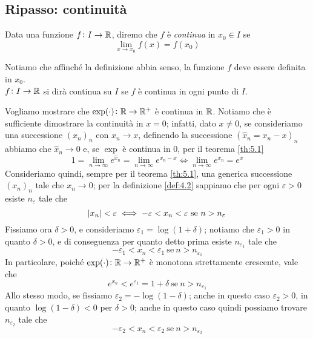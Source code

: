 \subsection{Ripasso: continuità}
\begin{definition}
    \label{def:5.3}
    Data una funzione $f\colon I \to \amsbb{R}$, diremo che $f$ è \emph{continua} in $x_0\in I$ se
    \[
    \lim_{x\to x_0} f(x) = f(x_0)
    \]
\end{definition}
\begin{remark}
    Notiamo che affinché la definizione abbia senso, la funzione $f$ deve essere definita in $x_0$.\\
    $f\colon I \to \amsbb{R}$ si dirà continua su $I$ se $f$ è continua in ogni punto di $I$.
\end{remark}
\begin{example}
    Vogliamo mostrare che $\exp(\cdot)\colon \amsbb{R}\to\amsbb{R}^+$ è continua in $\amsbb{R}$. Notiamo che è sufficiente dimostrare la continuità in $x=0$; infatti, dato $x\ne 0$, se consideriamo una successione $(x_n)_n$ con $x_n\to x$, definendo la successione $(\hat{x}_n = x_n -x)_n$ abbiamo che $\hat{x}_n\to 0$ e, se $\exp$ è continua in 0, per il teorema \ref{th:5.1}
    \[
    1=\lim_{n\to\infty} e^{\hat{x}_n}=\lim_{n\to\infty}e^{x_n-x} \iff \lim_{n\to\infty} e^{x_n} = e^x
    \]
    Consideriamo quindi, sempre per il teorema \ref{th:5.1}, una generica successione $(x_n)_n$ tale che $x_n\to 0$; per la definizione \ref{def:4.2} sappiamo che per ogni $\varepsilon>0$ esiste $n_\varepsilon$ tale che
    \[
    \abs{x_n}<\varepsilon \iff -\varepsilon<x_n < \varepsilon \ \text{se} \ n>n_\varepsilon
    \]
    Fissiamo ora $\delta>0$, e consideriamo $\varepsilon_1 = \log(1+\delta)$; notiamo che $\varepsilon_1>0$ in quanto $\delta>0$, e di conseguenza per quanto detto prima esiste $n_{\varepsilon_1}$ tale che
    \[
    -\varepsilon_1 < x_n < \varepsilon_1 \ \text{se} \ n>n_{\varepsilon_1}
    \]
    In particolare, poiché $\exp(\cdot)\colon \amsbb{R}\to \amsbb{R}^+$ è monotona strettamente crescente, vale che
    \begin{equation}
        \label{eq:5.6}
        e^{x_n}<e^{\varepsilon_1} = 1+\delta \ \text{se} \ n>n_{\varepsilon_1}
    \end{equation}
    Allo stesso modo, se fissiamo $\varepsilon_2 = -\log(1-\delta)$; anche in questo caso $\varepsilon_2>0$, in quanto $\log(1-\delta)<0$ per $\delta>0$; anche in questo caso quindi possiamo trovare $n_{\varepsilon_2}$ tale che
    \[
    -\varepsilon_2 < x_n < \varepsilon_2 \ \text{se} \ n>n_{\varepsilon_2}
\]
\end{example}
